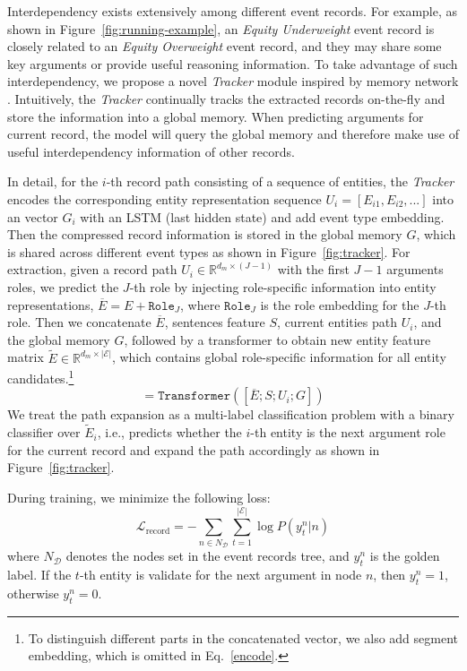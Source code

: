 \documentclass[11pt,a4paper]{article}
\begin{document}
Interdependency exists extensively among different event records.
For example, as shown in Figure~\ref{fig:running-example}, an \textit{Equity Underweight} event record is closely related to an \textit{Equity Overweight} event record, and they may share some key arguments or provide useful reasoning information.
To take advantage of such interdependency, we propose a novel \textit{Tracker} module inspired by memory network \citep{DBLP:journals/corr/WestonCB14}.
Intuitively, the \textit{Tracker} continually tracks the extracted records on-the-fly and store the information into a global memory.
When predicting arguments for current record, the model will query the global memory and therefore make use of useful interdependency information of other records.

In detail, for the $i$-th record path consisting of a sequence of entities, the \textit{Tracker} encodes the corresponding entity representation sequence $U_i = [E_{i1}, E_{i2}, ...]$ into an vector $G_i$ with an LSTM (last hidden state) and add event type embedding.
Then the compressed record information is stored in the global memory $G$, which is shared across different event types as shown in Figure~\ref{fig:tracker}.
For extraction, given a record path $U_i \in \mathbb{R}^{d_m \times (J-1)}$ with the first $J-1$ arguments roles, we predict the $J$-th role by injecting role-specific information into entity representations, $\overline{E} = E + \texttt{Role}_J$, where $\texttt{Role}_J$ is the role embedding for the $J$-th role.
Then we concatenate $\overline{E}$, sentences feature $S$, current entities path $U_i$, and the global memory $G$, followed by a transformer to obtain new entity feature matrix $\widetilde{E} \in \mathbb{R}^{d_m \times \left | \mathcal{E} \right |}$, which contains global role-specific information for all entity candidates.\footnote{To distinguish different parts in the concatenated vector, we also add segment embedding, which is omitted in Eq.~\ref{encode}.}
\begin{equation*}
    [\widetilde{E}, \widetilde{S}, \widetilde{U}_i, \widetilde{G}] = \texttt{Transformer}([\overline{E};S;U_i;G])
\label{encode}
\end{equation*}
We treat the path expansion as a multi-label classification problem with a binary classifier over $\widetilde{E}_i$, i.e., predicts whether the $i$-th entity is the next argument role for the current record and expand the path accordingly as shown in Figure~\ref{fig:tracker}.

During training, we minimize the following loss:
\begin{equation}
    \mathcal{L}_{\mathrm{record}}=-\sum_{n \in N_\mathcal{D}} \sum_{t=1}^{\left | \mathcal{E} \right |} \log P(y^n_t|n)
\label{loss:record}
\end{equation}
where $N_\mathcal{D}$ denotes the nodes set in the event records tree, and $y^n_t$ is the golden label.
If the $t$-th entity is validate for the next argument in node $n$, then $y^n_t=1$, otherwise $y^n_t=0$.
\end{document}

